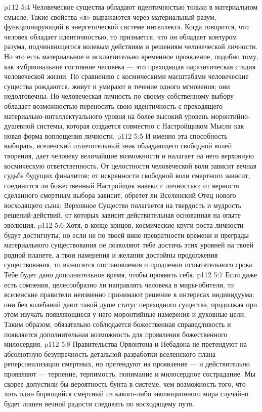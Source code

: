 \vs p112 5:4 Человеческие существа обладают идентичностью только в материальном смысле. Такие свойства «я» выражаются через материальный разум, функционирующий в энергетической системе интеллекта. Когда говорится, что человек обладает идентичностью, то признается, что он обладает контуром разума, подчиняющегося волевым действиям и решениям человеческой личности. Но это есть материальное и исключительно временное проявление, подобно тому, как эмбриональное состояние человека --- это преходящая паразитическая стадия человеческой жизни. По сравнению с космическими масштабами человеческие существа рождаются, живут и умирают в течение одного мгновения; они недолговечны. Но человеческая личность по своему собственному выбору обладает возможностью переносить свою идентичность с преходящего материально\hyp{}интеллектуального уровня на более высокий уровень моронтийно\hyp{}душевной системы, которая создается совместно с Настройщиком Мысли как новая форма воплощения личности.
\vs p112 5:5 И именно эта способность выбирать, вселенский отличительный знак обладающего свободной волей творения, дает человеку величайшие возможности и налагает на него верховную космическую ответственность. От целостности человеческой воли зависит вечная судьба будущих финалитов; от искренности свободной воли смертного зависит, соединится ли божественный Настройщик навеки с личностью; от верности сделанного смертным выбора зависит, обретет ли Вселенский Отец нового восходящего сына; Верховное Существо полагается на твердость и мудрость решений\hyp{}действий, от которых зависит действительная основанная на опыте эволюция.
\vs p112 5:6 \pc Хотя, в конце концов, космические круги роста личности будут достигнуты, но если не по твоей вине превратности времени и преграды материального существования не позволяют тебе достичь этих уровней на твоей родной планете, а твои намерения и желания достойны продолжения существования, то выносятся постановления о продлении испытательного срока. Тебе будет дано дополнительное время, чтобы проявить себя.
\vs p112 5:7 Если даже есть сомнения, целесообразно ли направлять человека в миры\hyp{}обители, то вселенские правители неизменно принимают решение в интересах индивидуума; они без колебаний дают такой душе статус переходного существа, продолжая при этом изучать появляющиеся у него моронтийные намерения и духовные цели. Таким образом, обязательно соблюдается божественная справедливость и появляется дополнительная возможность для проявления божественного милосердия.
\vs p112 5:8 Правительства Орвонтона и Небадона не претендуют на абсолютную безупречность детальной разработки вселенского плана реперсонализации смертных, но претендуют на проявление --- и действительно проявляют --- терпение, терпимость, понимание и милосердное сострадание. Мы скорее допустили бы вероятность бунта в системе, чем возможность того, что хоть один борющийся смертный из какого\hyp{}либо эволюционного мира случайно будет лишен вечной радости следовать по восходящему пути.
